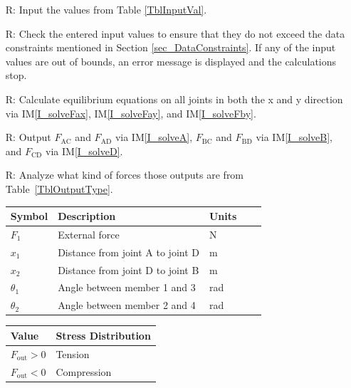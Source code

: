 \documentclass[12pt]{article}
\newcommand{\iref}[1]{IM\ref{#1}}
\newcounter{reqnum} %
\begin{document}
\noindent \begin{itemize}
	
\item[R\refstepcounter{reqnum}\thereqnum \label{R_Inputs}:] Input the values 
from Table \ref{TblInputVal}.

\item[R\refstepcounter{reqnum}\thereqnum \label{R_InputsCon}:] Check the 
entered input values to ensure that they do not exceed the data constraints
mentioned in Section \ref{sec_DataConstraints}. If any of the input values are 
out of bounds, an error message is displayed and the calculations stop.

\item[R\refstepcounter{reqnum}\thereqnum \label{R_Calculate}:] Calculate 
equilibrium equations on all joints in both the x and y direction via 
\iref{I_solveFax}, \iref{I_solveFay}, and \iref{I_solveFby}.

\item[R\refstepcounter{reqnum}\thereqnum \label{R_Output}:] Output 
$F_\text{{AC}}$ and $F_\text{{AD}}$ via \iref{I_solveA}, 
$F_\text{{BC}}$ and $F_\text{{BD}}$ via \iref{I_solveB}, and
$F_\text{{CD}}$ via \iref{I_solveD}.

\item[R\refstepcounter{reqnum}\thereqnum \label{R_AnalyzeOutput}:] Analyze what 
kind of forces those outputs are from Table~\ref{TblOutputType}.

\begin{table}[!h]
	\caption{Required Inputs} \label{TblInputVal}
	\renewcommand{\arraystretch}{1.2}
	\noindent \begin{longtable*}{l l l l c} 
		\toprule
		\textbf{Symbol} & \textbf{Description} & \textbf{Units} \\
		\midrule 
		$F_{\text{1}}$ & External force & \si{\newton} \\
		$x_{\text{1}}$ & Distance from joint A to joint D & \si{\metre} \\
		$x_{\text{2}}$ & Distance from joint D to joint B & \si{\metre}  \\
		$\theta_{\text{1}}$ & Angle between member 1 and 3 & \si{\radian} \\
		$\theta_{\text{2}}$ & Angle between member 2 and 4 & \si{\radian}  \\
		\bottomrule
		
	\end{longtable*}
\end{table}

\begin{table}[!h]
	\caption{Output Variables} \label{TblOutputType}
	\renewcommand{\arraystretch}{1.2}
	\noindent 
	\begin{longtable*}{l l} 
		\toprule
		\textbf{Value} & \textbf{Stress Distribution} \\
		\midrule 
		$F_\text{out} > 0$ & Tension \\		
		$F_\text{out} < 0$ & Compression \\
		\bottomrule
	\end{longtable*}
\end{table}
\end{itemize}
\end{document}
